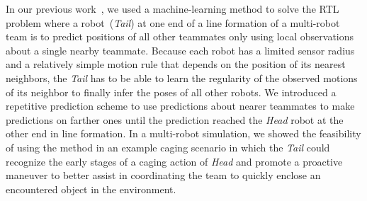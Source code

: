 \documentclass[letterpaper, 10 pt, conference]{ieeeconf}  %
\begin{document}
    In our previous work~\cite{CPR17}, we used a machine-learning method
    to solve the RTL problem where a robot~(\emph{Tail}) at one end of a
    line formation of a multi-robot team is to predict positions of all
    other teammates only using local observations about a single nearby
    teammate. Because each robot has a limited sensor radius and a
    relatively simple motion rule that depends on the position of its
    nearest neighbors, the \emph{Tail} has to be able to learn the
    regularity of the observed motions of its neighbor to finally infer
    the poses of all other robots. We introduced a repetitive prediction
    scheme to use predictions about nearer teammates to make predictions
    on farther ones until the prediction reached the \emph{Head} robot
    at the other end in line formation. In a multi-robot simulation, we
    showed the feasibility of using the method in an example caging
    scenario in which the \emph{Tail} could recognize the early stages
    of a caging action of \emph{Head} and promote a proactive maneuver
    to better assist in coordinating the team to quickly enclose an
    encountered object in the environment.
\end{document}
